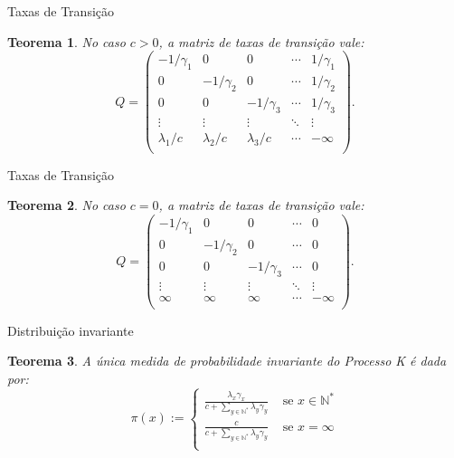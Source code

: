 \documentclass[xcolor=pdftex,dvipsnames]{beamer}
\newcommand{\Nz}{{\mathbb{N^*}}}
\newtheorem{teorema}{Teorema}
\begin{document}
\begin{frame}{Taxas de Transição}
  \begin{teorema}
    No caso $c > 0$, a matriz de taxas de transição vale:
    \begin{displaymath}
      Q = \left(
        \begin{array}{ccccc}
          -1/\gamma_1 & 0 & 0 & \cdots & 1/\gamma_1\\
          0 & -1/\gamma_2 & 0 & \cdots & 1/\gamma_2\\
          0 & 0 & -1/\gamma_3 & \cdots & 1/\gamma_3\\
          \vdots & \vdots & \vdots & \ddots & \vdots \\
          \lambda_1/c & \lambda_2/c &
          \lambda_3/c & \cdots & -\infty\\
        \end{array}
      \right).
    \end{displaymath}
  \end{teorema}
\end{frame}

\begin{frame}{Taxas de Transição}
  \begin{teorema}
    No caso $c = 0$, a matriz de taxas de transição vale:
    \begin{displaymath}
      Q = \left(
        \begin{array}{ccccc}
          -1/\gamma_1 & 0 & 0 & \cdots & 0\\
          0 & -1/\gamma_2 & 0 & \cdots & 0\\
          0 & 0 & -1/\gamma_3 & \cdots & 0\\
          \vdots & \vdots & \vdots & \ddots & \vdots \\
          \infty & \infty & \infty & \cdots & -\infty\\
        \end{array}
      \right).
    \end{displaymath}
  \end{teorema}
\end{frame}

\begin{frame}{Distribuição invariante}
  \begin{teorema}
    A única medida de probabilidade invariante do Processo K é dada
    por:
    \begin{displaymath}
      \pi(x) := \begin{cases}
        \frac{\lambda_x \gamma_x}{c + \sum_{y \in \Nz} \lambda_y \gamma_y}
        & \textrm{ se } x \in \Nz \\
        \frac{c}{c + \sum_{y \in \Nz} \lambda_y \gamma_y}
        & \textrm{ se } x = \infty \\
      \end{cases}
    \end{displaymath}
  \end{teorema}
\end{frame}
\end{document}

